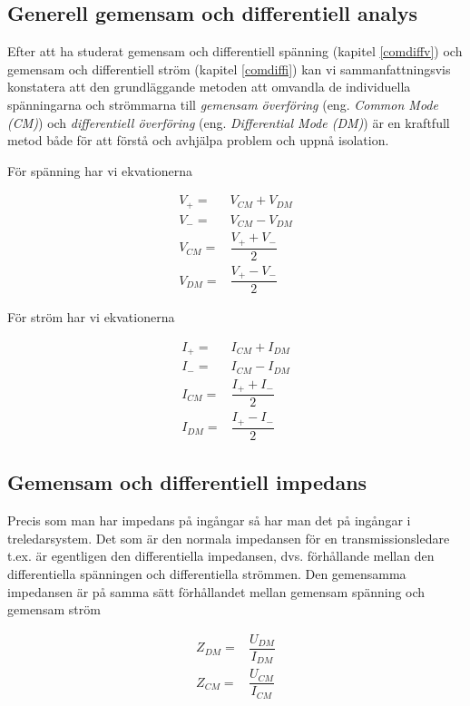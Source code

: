 \subsection{Generell gemensam och differentiell analys}
\label{comdiffgeneric}

Efter att ha studerat gemensam och differentiell spänning (kapitel
\ref{comdiffv}) och gemensam och differentiell ström (kapitel \ref{comdiffi})
kan vi sammanfattningsvis konstatera att den grundläggande metoden att omvandla
de individuella spänningarna och strömmarna till \emph{gemensam överföring}
(eng. \emph{Common Mode (CM)}) och \emph{differentiell överföring}
(eng. \emph{Differential Mode (DM)}) är en kraftfull metod både för att
förstå och avhjälpa problem och uppnå isolation.

För spänning har vi ekvationerna

\begin{eqnarray}
V_+ = & V_{CM} + V_{DM}\\
V_- = & V_{CM} - V_{DM}\\
V_{CM} = & \dfrac{V_+ + V_-}{2}\\
V_{DM} = & \dfrac{V_+ - V_-}{2}
\end{eqnarray}

För ström har vi ekvationerna

\begin{eqnarray}
I_+ = & I_{CM} + I_{DM}\\
I_- = & I_{CM} - I_{DM}\\
I_{CM} = & \dfrac{I_+ + I_-}{2}\\
I_{DM} = & \dfrac{I_+ - I_-}{2}
\end{eqnarray}

\subsection{Gemensam och differentiell impedans}

Precis som man har impedans på ingångar så har man det på ingångar i
treledarsystem.
Det som är den normala impedansen för en transmissionsledare t.ex. är
egentligen den differentiella impedansen, dvs. förhållande mellan den
differentiella spänningen och differentiella strömmen.
Den gemensamma impedansen är på samma sätt förhållandet mellan gemensam
spänning och gemensam ström

\begin{eqnarray}
Z_{DM} = & \dfrac{U_{DM}}{I_{DM}}\\
Z_{CM} = & \dfrac{U_{CM}}{I_{CM}}
\end{eqnarray}

